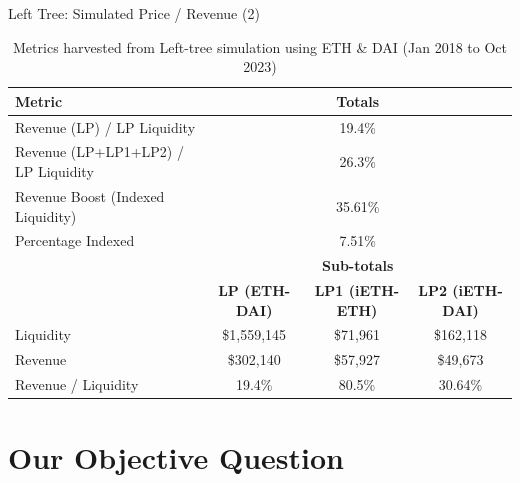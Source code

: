 \documentclass[10pt,xcolor=svgnames]{beamer} %
\begin{document}
\begin{frame}{Left Tree: Simulated Price / Revenue (2)}


\begin{table}[h]
\tiny
\centering
\begin{tabular}{ |l|c|c|c| } 
\hline
 \textbf{Metric} & \multicolumn{3}{|c|}{\textbf{Totals}}\\
\hline 
 Revenue (LP) / LP Liquidity & \multicolumn{3}{|c|}{19.4\% }\\
 Revenue (LP+LP1+LP2) / LP Liquidity & \multicolumn{3}{|c|}{26.3\% }\\
 Revenue Boost (Indexed Liquidity)  & \multicolumn{3}{|c|}{35.61\%}\\ 
 Percentage Indexed & \multicolumn{3}{|c|}{7.51\%}\\ 
 \hline
\hline
	& \multicolumn{3}{|c|}{\textbf{Sub-totals}} \\
  & \textbf{LP (ETH-DAI)} & \textbf{LP1 (iETH-ETH)} & \textbf{LP2 (iETH-DAI)} \\
\hline
Liquidity  & \$1,559,145 & \$71,961 & \$162,118\\
Revenue  & \$302,140 & \$57,927 & \$49,673\\
Revenue / Liquidity  & 19.4\% & 80.5\% & 30.64\%\\ 
\hline
\end{tabular}
\caption{Metrics harvested from Left-tree simulation using ETH \& DAI (Jan 2018 to Oct 2023)}
\label{table:simulator_components}
\end{table}

\end{frame}



\section{Our Objective Question}
\end{document}
